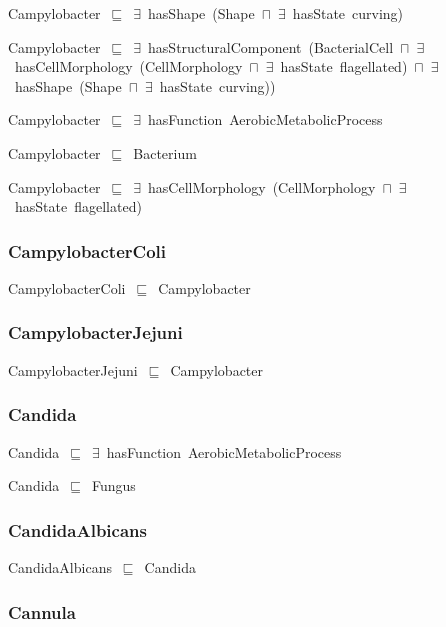 \documentclass{article}
\begin{document}
Campylobacter~\ensuremath{\sqsubseteq}~\ensuremath{\exists}~hasShape~(Shape~\ensuremath{\sqcap}~\ensuremath{\exists}~hasState~curving)~

Campylobacter~\ensuremath{\sqsubseteq}~\ensuremath{\exists}~hasStructuralComponent~(BacterialCell~\ensuremath{\sqcap}~\ensuremath{\exists}~hasCellMorphology~(CellMorphology~\ensuremath{\sqcap}~\ensuremath{\exists}~hasState~flagellated)~\ensuremath{\sqcap}~\ensuremath{\exists}~hasShape~(Shape~\ensuremath{\sqcap}~\ensuremath{\exists}~hasState~curving))~

Campylobacter~\ensuremath{\sqsubseteq}~\ensuremath{\exists}~hasFunction~AerobicMetabolicProcess~

Campylobacter~\ensuremath{\sqsubseteq}~Bacterium~

Campylobacter~\ensuremath{\sqsubseteq}~\ensuremath{\exists}~hasCellMorphology~(CellMorphology~\ensuremath{\sqcap}~\ensuremath{\exists}~hasState~flagellated)~

\subsubsection*{CampylobacterColi}

CampylobacterColi~\ensuremath{\sqsubseteq}~Campylobacter~

\subsubsection*{CampylobacterJejuni}

CampylobacterJejuni~\ensuremath{\sqsubseteq}~Campylobacter~

\subsubsection*{Candida}

Candida~\ensuremath{\sqsubseteq}~\ensuremath{\exists}~hasFunction~AerobicMetabolicProcess~

Candida~\ensuremath{\sqsubseteq}~Fungus~

\subsubsection*{CandidaAlbicans}

CandidaAlbicans~\ensuremath{\sqsubseteq}~Candida~

\subsubsection*{Cannula}
\end{document}
